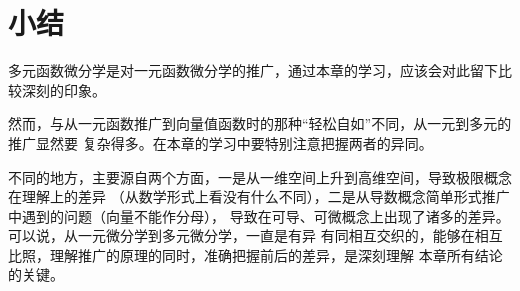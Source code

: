 \section{小结}

多元函数微分学是对一元函数微分学的推广，通过本章的学习，应该会对此留下比较深刻的印象。

然而，与从一元函数推广到向量值函数时的那种“轻松自如”不同，从一元到多元的推广显然要
复杂得多。在本章的学习中要特别注意把握两者的异同。

不同的地方，主要源自两个方面，一是从一维空间上升到高维空间，导致极限概念在理解上的差异
（从数学形式上看没有什么不同），二是从导数概念简单形式推广中遇到的问题（向量不能作分母），
导致在可导、可微概念上出现了诸多的差异。可以说，从一元微分学到多元微分学，一直是有异
有同相互交织的，能够在相互比照，理解推广的原理的同时，准确把握前后的差异，是深刻理解
本章所有结论的关键。
% 

